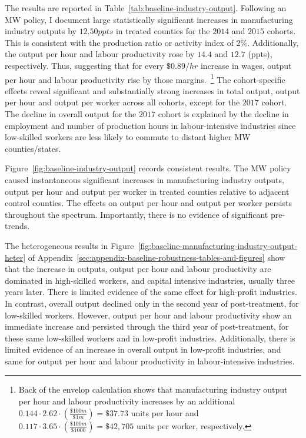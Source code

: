 \documentclass[authoryear, preprint, twocolumn, 1p]{elsarticle}
\begin{document}
    The results are reported in Table~\ref{tab:baseline-industry-output}. Following an MW policy, I document large statistically significant increases in manufacturing industry outputs by $12.50ppts$ in treated counties for the $2014$ and $2015$ cohorts. This is consistent with the production ratio or activity index of $2\%$. Additionally, the output per hour and labour productivity rose by $14.4$ and $12.7$ (ppts), respectively. Thus, suggesting that for every $\$0.89/hr$ increase in wages, output per hour and labour productivity rise by those margins.~\footnote{\tiny Back of the envelop calculation shows that manufacturing industry output per hour and labour productivity increases by an additional $0.144 \cdot 2.62 \cdot \left(\frac{\$100m}{\$1m}\right) = \$37.73$ units per hour and $0.117 \cdot 3.65 \cdot \left(\frac{\$100m}{\$1000}\right) = \$42,705$ units per worker, respectively.} The cohort-specific effects reveal significant and substantially strong increases in total output, output per hour and output per worker across all cohorts, except for the $2017$ cohort. The decline in overall output for the $2017$ cohort is explained by the decline in employment and number of production hours in labour-intensive industries since low-skilled workers are less likely to commute to distant higher MW counties/states.

    Figure~\ref{fig:baseline-industry-output} records consistent results. The MW policy caused instantaneous significant increases in manufacturing industry outputs, output per hour and output per worker in treated counties relative to adjacent control counties. The effects on output per hour and output per worker persists throughout the spectrum. Importantly, there is no evidence of significant pre-trends.
    

    The heterogeneous results in Figure~\ref{fig:baseline-manufacturing-industry-output-heter} of Appendix~\ref{sec:appendix-baseline-robustness-tables-and-figures} show that the increase in outputs, output per hour and labour productivity are dominated in high-skilled workers, and capital intensive industries, usually three years later. There is limited evidence of the same effect for high-profit industries. In contrast, overall output declined only in the second year of post-treatment, for low-skilled workers. However, output per hour and labour productivity show an immediate increase and persisted through the third year of post-treatment, for these same low-skilled workers and in low-profit industries. Additionally, there is limited evidence of an increase in overall output in low-profit industries, and same for output per hour and labour productivity in labour-intensive industries.
\end{document}
